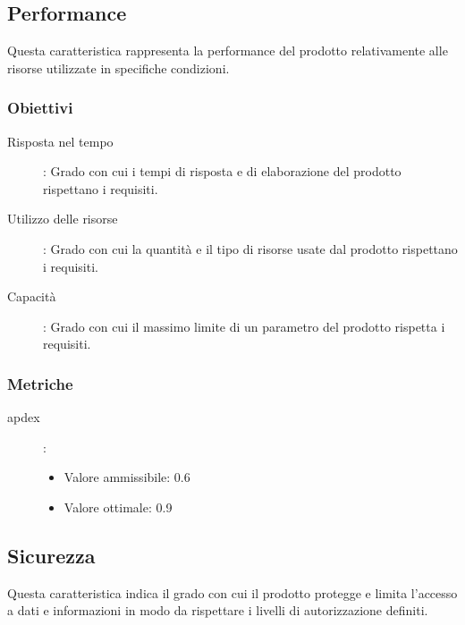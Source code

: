 \documentclass[../piano-di-qualifica.tex]{subfiles}
\begin{document}


\subsection{Performance}%
\label{sub:performance}
 Questa caratteristica rappresenta la performance del prodotto relativamente alle risorse utilizzate in specifiche condizioni.
  \subsubsection{Obiettivi}%
  \label{subs:obiettivi}
      \begin{description}
        \item[Risposta nel tempo]: Grado con cui i tempi di risposta e di elaborazione del prodotto rispettano i requisiti.
        \item[Utilizzo delle risorse]: Grado con cui la quantità e il tipo di risorse usate dal prodotto rispettano i requisiti.
        \item[Capacità]: Grado con cui il massimo limite di un parametro del prodotto rispetta i requisiti.
      \end{description}

  \subsubsection{Metriche}%
  \label{subs:metriche}
    \begin{description}
      \item [apdex]:
      \begin{itemize} \item Valore ammissibile: 0.6 \item Valore ottimale: 0.9 \end{itemize}
      \end{description}


\subsection{Sicurezza}%
\label{sub:sicurezza}
 Questa caratteristica indica il grado con cui il prodotto protegge e limita l'accesso a dati e informazioni in modo da rispettare i livelli di autorizzazione definiti.
\end{document}
